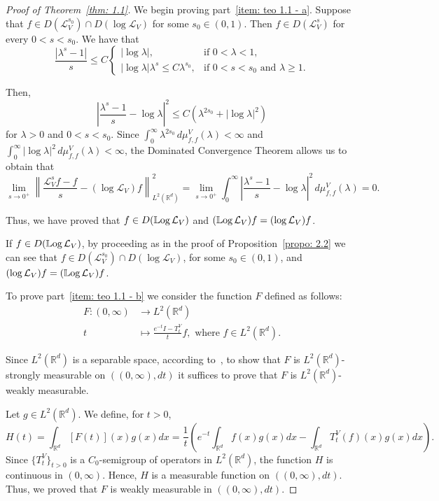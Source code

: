 \documentclass[10pt, a4paper, reqno]{amsart}
\theoremstyle{definition}
\theoremstyle{remark}
\DeclareMathOperator{\LLog}{\mathbb{L}\textup{og}}
\newcommand{\RR}{\mathbb{R}}
\numberwithin{equation}{section}
\begin{document}
\begin{proof}[Proof of Theorem~\ref{thm: 1.1}]
We begin proving part~\ref{item: teo 1.1 - a}. Suppose that $f \in D(\mathcal{L}_V^{s_0}) \cap D(\log \mathcal{L}_V)$ for some $s_0 \in (0,1)$. Then $f \in D(\mathcal{L}_V^s)$ for every $0 < s < s_0$. We have that
\[
\frac{|\lambda^s-1|}{s} \leq C \begin{cases}
    |\log \lambda|, & \text{if } 0 < \lambda < 1, \\
    |\log \lambda| \lambda^s \leq C \lambda^{s_0}, & \text{if } 0 < s < s_0 \text{ and } \lambda \geq 1.
\end{cases}
\]

Then, 
\[ 
\left| \frac{\lambda^{s}-1}{s} - \log \lambda\right|^2 \leq C (\lambda^{2s_0} + |\log \lambda|^2)
\]
for $\lambda > 0$ and $0 < s < s_0$. Since $\int_0^\infty \lambda^{2s_0} \, d\mu_{f,f}^V(\lambda) < \infty$ and $\int_0^\infty |\log\lambda|^2 \, d\mu_{f,f}^V(\lambda) < \infty$, the Dominated Convergence Theorem allows us to obtain that
\[
\lim_{s \rightarrow 0^+} 
\left\|
\frac{\mathcal{L}_V^s f - f}{s} - (\log \mathcal{L}_V) f
\right\|_{L^2(\mathbb{R}^d)}^2 = 
\lim_{s \rightarrow 0^+}
\int_0^\infty \left| \frac{\lambda^{s}-1}{s} - \log \lambda\right|^2 \, d\mu_{f,f}^V(\lambda) = 0.
\]

Thus, we have proved that $f \in D(\LLog \mathcal{L}_V)$ and $(\LLog \mathcal{L}_V)f = (\log \mathcal{L}_V) f$.

If $f\in D(\LLog \mathcal{L}_V)$, by proceeding as in the proof of Proposition~\ref{propo: 2.2} we can see that $f\in D(\mathcal{L}_V^{s_0})\cap D(\log \mathcal{L}_V)$, for some $s_0\in (0,1)$, and $(\log \mathcal{L}_V) f = (\LLog \mathcal{L}_V) f$.

To prove part~\ref{item: teo 1.1 - b} we consider the function $F$ defined as follows:
\begin{equation*}%
    \begin{aligned}
F: (0,\infty) & \rightarrow L^2(\mathbb{R}^d) \\
t & \mapsto \frac{e^{-t}I - T_t^V}{t} f, \text{ where } f\in L^2(\mathbb R^d). 
\end{aligned}
\end{equation*}

Since $L^2(\mathbb{R}^d)$ is a separable space, according to~\cite[p.~131]{Yo}, to show that $F$ is $L^2(\mathbb{R}^d)$-strongly measurable on $((0,\infty), dt)$ it suffices to prove that $F$ is $L^2(\mathbb{R}^d)$-weakly measurable.

Let $g\in L^2(\mathbb{R}^d)$. We define, for $t>0$,
\begin{equation*}
    H(t) = \int_{\RR^d} [F(t)](x) g(x) dx = \frac{1}{t} \left( e^{-t} \int_{\RR^d} f(x)g(x)dx - \int_{\RR^d} T_t^V(f)(x)g(x)dx\right).
\end{equation*}
Since $\{T_t^V\}_{t>0}$ is a $C_0$-semigroup of operators in $L^2(\mathbb{R}^d)$, the function $H$ is continuous in $(0,\infty)$. Hence, $H$ is a measurable function on $((0,\infty), dt)$. Thus, we proved that $F$ is weakly measurable in $((0,\infty),dt)$.



\end{proof}
\end{document}
